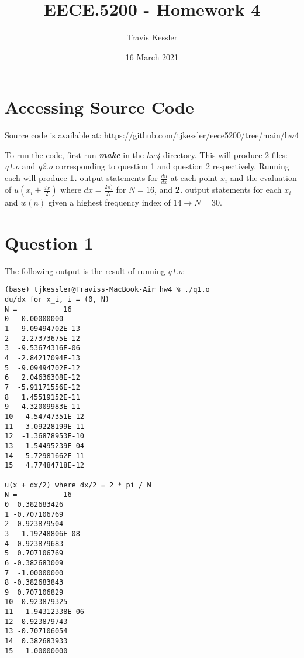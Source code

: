 \documentclass{report}
\title{EECE.5200 - Homework 4}
\author{Travis Kessler}
\date{16 March 2021}
\begin{document}
	\maketitle
	\newpage

	\lstset{frame=lines}

	\section*{Accessing Source Code}
	
	Source code is available at: \href{https://github.com/tjkessler/eece5200/tree/main/hw4}{https://github.com/tjkessler/eece5200/tree/main/hw4}
	
	\textit{}
	
	\noindent To run the code, first run \textbf{\textit{make}} in the \textit{hw4} directory. This will produce 2 files: \textit{q1.o} and \textit{q2.o} corresponding to question 1 and question 2 respectively. Running each will produce \textbf{1.} output statements for $\frac{du}{dx}$ at each point $x_i$ and the evaluation of $u(x_i + \frac{dx}{2})$ where $dx = \frac{2 \pi)}{N}$ for $N = 16$, and \textbf{2.} output statements for each $x_i$ and $w(n)$ given a highest frequency index of $14 \rightarrow N = 30$. 

	\section*{Question 1}
	
	The following output is the result of running \textit{q1.o}:
	
	\begin{lstlisting}
(base) tjkessler@Traviss-MacBook-Air hw4 % ./q1.o 
du/dx for x_i, i = (0, N)
N =           16
0   0.00000000    
1   9.09494702E-13
2  -2.27373675E-12
3  -9.53674316E-06
4  -2.84217094E-13
5  -9.09494702E-12
6   2.04636308E-12
7  -5.91171556E-12
8   1.45519152E-11
9   4.32009983E-11
10   4.54747351E-12
11  -3.09228199E-11
12  -1.36878953E-10
13   1.54495239E-04
14   5.72981662E-11
15   4.77484718E-12

u(x + dx/2) where dx/2 = 2 * pi / N
N =           16
0  0.382683426    
1 -0.707106769    
2 -0.923879504    
3   1.19248806E-08
4  0.923879683    
5  0.707106769    
6 -0.382683009    
7  -1.00000000    
8 -0.382683843    
9  0.707106829    
10  0.923879325    
11  -1.94312338E-06
12 -0.923879743    
13 -0.707106054    
14  0.382683933    
15   1.00000000 
	\end{lstlisting}
\end{document}

